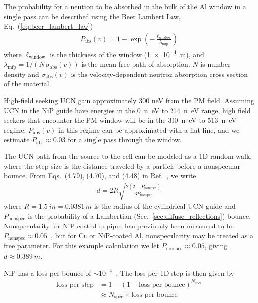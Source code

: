 The probability for a neutron to be absorbed in the bulk of the Al window in a single pass can be described using the Beer Lambert Law, Eq.~(\ref{eq:beer_lambert_law})
%
\begin{gather*}
   P_\text{abs}(v) = 1 - \exp \left( - \frac{\ell_\text{window} }{ \lambda_\text{mfp} } \right)
\end{gather*}
%
where $\ell_\text{window}$ is the thickness of the window (\qty{1e-4}{m}), and $\lambda_\text{mfp} = 1 / (N\,\sigma_\text{abs}(v))$ is the mean free path of absorption. $N$ is number density and $\sigma_\text{abs}(v)$ is the velocity-dependent neutron absorption cross section of the material. 

High-field seeking UCN gain approximately 300 neV from the PM field. Assuming UCN in the NiP guide have energies in the \qty{0}{n\eV} to \qty{214}{n\eV} range, high field seekers that encounter the PM window will be in the \qty{300}{n\eV} to \qty{513}{n\eV} regime. $P_\text{abs}(v)$ in this regime can be approximated with a flat line, and we estimate $P_\text{abs}\approx 0.03$ for a single pass through the window.

The UCN path from the source to the cell can be modeled as a 1D random walk, where the step size is the distance traveled by a particle before a nonspecular bounce. From Eqs.~(4.79), (4.70), and (4.48) in Ref.~\cite{golubUCN}, we write
%
\begin{gather}
    d = 2 R\sqrt{\frac{2(2-P_\text{nonspec})}{3P_\text{nonspec}} }
\end{gather}
%
where $R=\qty{1.5}{in}=\qty{0.0381}{m}$ is the radius of the cylindrical UCN guide and $P_\text{nonspec}$ is the probability of a Lambertian (Sec.~\ref{sec:diffuse_reflections}) bounce. Nonspecularity for NiP-coated \acrshort{ss} pipes has previously been measured to be $P_\text{nonspec}\approx0.05$~\cite{pattie_jr_evaluation_2017}, but for Cu or NiP-coated Al, nonspecularity may be treated as a free parameter. For this example calculation we let $P_\text{nonspec}\approx0.05$, giving $d\approx \qty{0.389}{m}$.

NiP has a loss per bounce of $\sim 10^{-4}$~\cite{pattie_jr_evaluation_2017}. The loss per 1D step is then given by
%
\begin{align}
    \text{loss per step} &= 1 - \left(1 - \text{loss per bounce} \right)^{N_\text{spec}}\\
    &\approx N_\text{spec} \times \text{loss per bounce}
\end{align}

